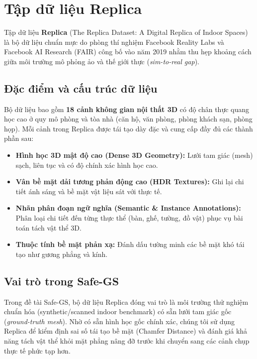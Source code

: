 \section{Tập dữ liệu Replica}
Tập dữ liệu \textbf{Replica} (The Replica Dataset: A Digital Replica of Indoor Spaces)~\cite{straub2019replica} là bộ dữ liệu chuẩn mực do phòng thí nghiệm Facebook Reality Labs và Facebook AI Research (FAIR) công bố vào năm 2019 nhằm thu hẹp khoảng cách giữa môi trường mô phỏng ảo và thế giới thực (\textit{sim-to-real gap}).

\subsection{Đặc điểm và cấu trúc dữ liệu}
Bộ dữ liệu bao gồm \textbf{18 cảnh không gian nội thất 3D} có độ chân thực quang học cao ở quy mô phòng và tòa nhà (căn hộ, văn phòng, phòng khách sạn, phòng họp). Mỗi cảnh trong Replica được tái tạo dày đặc và cung cấp đầy đủ các thành phần sau:
\begin{itemize}
    \item \textbf{Hình học 3D mật độ cao (Dense 3D Geometry):} Lưới tam giác (mesh) sạch, liên tục và có độ chính xác hình học cao.
    \item \textbf{Vân bề mặt dải tương phản động cao (HDR Textures):} Ghi lại chi tiết ánh sáng và bề mặt vật liệu sát với thực tế.
    \item \textbf{Nhãn phân đoạn ngữ nghĩa (Semantic \& Instance Annotations):} Phân loại chi tiết đến từng thực thể (bàn, ghế, tường, đồ vật) phục vụ bài toán tách vật thể 3D.
    \item \textbf{Thuộc tính bề mặt phản xạ:} Đánh dấu tường minh các bề mặt khó tái tạo như gương phẳng và kính.
\end{itemize}

\subsection{Vai trò trong Safe-GS}
Trong đề tài Safe-GS, bộ dữ liệu Replica đóng vai trò là môi trường thử nghiệm chuẩn hóa (synthetic/scanned indoor benchmark) có sẵn lưới tam giác gốc (\textit{ground-truth mesh}). Nhờ có sẵn hình học gốc chính xác, chúng tôi sử dụng Replica để kiểm định sai số tái tạo bề mặt (Chamfer Distance) và đánh giá khả năng tách vật thể khỏi mặt phẳng nâng đỡ trước khi chuyển sang các cảnh chụp thực tế phức tạp hơn.
